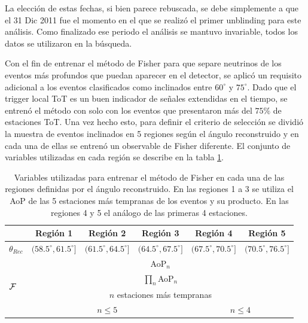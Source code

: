 	La elección de estas fechas, si bien parece rebuscada, se debe simplemente a que el 31 Dic 2011 fue el momento en el que se realizó el primer unblinding para este análisis.
	Como finalizado ese periodo el análisis se mantuvo invariable, todos los datos se utilizaron en la búsqueda.
	
	Con el fin de entrenar el método de Fisher para que separe neutrinos de los eventos más profundos que puedan aparecer en el detector, se aplicó un requisito adicional a los eventos clasificados como inclinados entre $60^\circ$ y $75^\circ$.
	Dado que el trigger local ToT es un buen indicador de señales extendidas en el tiempo, se entrenó el método con solo con los eventos que presentaron más del $75\%$ de estaciones ToT.
	Una vez hecho esto, para definir el criterio de selección se dividió la muestra de eventos inclinados en 5 regiones según el ángulo reconstruido y en cada una de ellas se entrenó un observable de Fisher diferente.
	El conjunto de variables utilizadas en cada región se describe en la tabla \ref{tab:fisherDGL}. 
	\begin{table}[h!]
		\begin{center}
		\renewcommand{\arraystretch}{1.4}
		\footnotesize
			\begin{tabular}{|l|c|c|c|c|c|}
			\hline
			& Región 1 & Región 2 & Región 3 & Región 4 & Región 5 \\
			\hline
			$\theta_{Rec}$ & $(58.5^\circ,61.5^\circ]$ & $(61.5^\circ,64.5^\circ]$ &$(64.5^\circ,67.5^\circ]$ &$(67.5^\circ,70.5^\circ]$ & $(70.5^\circ,76.5^\circ]$ \\
			\hline
			\multirow{4}{*}{$\cal{F}$}  & \multicolumn{5}{c|}{AoP$_n$} \\
			                 & \multicolumn{5}{c|}{$\prod_n$AoP$_n$} \\
			                 & \multicolumn{5}{c|}{$n$ estaciones más tempranas} \\
			                 & \multicolumn{3}{c|}{$n\leq5$} & \multicolumn{2}{c|}{$n\leq4$} \\
			\hline
			\end{tabular}
			\caption{\label{tab:fisherDGL}
			Variables utilizadas para entrenar el método de Fisher en cada una de las regiones definidas por el ángulo reconstruido. En las regiones 1 a 3 se utiliza el AoP de las 5 estaciones más tempranas de los eventos y su producto. En las regiones 4 y 5 el análogo de las primeras 4 estaciones.}
		\end{center}	 
	\end{table}
	
